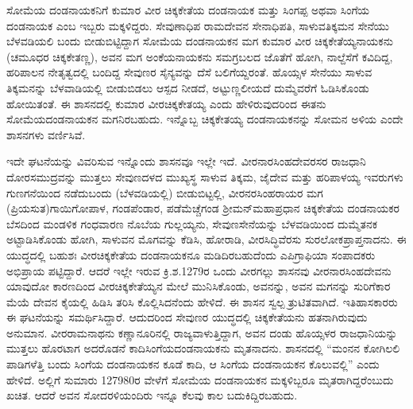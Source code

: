 \vskip 2pt

ಸೋಮೆಯ ದಂಡನಾಯಕನಿಗೆ ಕುಮಾರ ವೀರ ಚಿಕ್ಕಕೇತೆಯ ದಂಡನಾಯಕ ಮತ್ತು ಸಿಂಗಪ್ಪ ಅಥವಾ ಸಿಂಗೆಯ ದಂಡನಾಯಕ ಎಂಬ ಇಬ್ಬರು ಮಕ್ಕಳಿದ್ದರು. ಸೇವುಣಾಧಿಪ ರಾಮದೇವನ ಸೇನಾಧಿಪತಿ, ಸಾಳುವತಿಕ್ಕಮನ ಸೇನೆಯು ಬೆಳವಡಿಯಲಿ ಬಂದು ಬೀಡುಬಿಟ್ಟಿದ್ದಾಗ ಸೋಮೆಯ ದಂಡನಾಯಕನ ಮಗ ಕುಮಾರ ವೀರ ಚಿಕ್ಕಕೇತೆಯ್ಯನಾಯಕನು (ಚಮೂಧರ ಚಿಕ್ಕಕೇತಣ್ಣ), ಅವನ ಮಗ ಅಂಕೆಯನಾಯಕನು ಸಮಗ್ರಬಲದ ಜೊತೆಗೆ ಹೋಗಿ, ನಾಲ್ದೆಸೆಗೆ ಕವಿದಿದ್ದ, ಹರಿಪಾಲನ ನೇತೃತ್ವದಲ್ಲಿ ಬಂದಿದ್ದ ಸೇವುಣರ ಸೈನ್ಯವನ್ನು ದೆಸೆ ಬಲಿಗೆಯ್ದರಂತೆ. ಹೊಯ್ಸಳ ಸೇನೆಯು ಸಾಳುವ ತಿಕ್ಕಮನನ್ನು ಬೆಳವಾಡಿಯಲ್ಲಿ ಬೀಡುಬಿಡಲು ಆಸ್ಪದ ನೀಡದೆ, ಅಟ್ಟುಣ್ಣಲೀಯದೆ ದುಮ್ಮೆವರೆಗೆ ಓಡಿಸಿಕೊಂಡು ಹೋಯಿತಂತೆ. ಈ ಶಾಸನದಲ್ಲಿ ಕುಮಾರ ವೀರಚಿಕ್ಕಕೇತಯ್ಯ ಎಂದು ಹೇಳಿರುವುದರಿಂದ ಈತನು ಸೋಮೆಯದಂಡನಾಯಕನ ಮಗನಿರಬಹುದು. ಇನ್ನೊಬ್ಬ ಚಿಕ್ಕಕೇತಯ್ಯ ದಂಡನಾಯಕನನ್ನು ಸೋಮನ ಅಳಿಯ ಎಂದೇ ಶಾಸನಗಳು ವರ್ಣಿಸಿವೆ.

\vskip 2pt

ಇದೇ ಘಟನೆಯನ್ನು ವಿವರಿಸುವ ಇನ್ನೊಂದು ಶಾಸನವೂ ಇಲ್ಲೇ ಇದೆ. ವೀರನಾರಸಿಂಹದೇವರಸರ ರಾಜಧಾನಿ ದೋರಸಮುದ್ರವನ್ನು ಮುತ್ತಲು ಸೇವುಣದಳದ ಮುಖ್ಯಸ್ಥ ಸಾಳುವ ತಿಕ್ಕಮ, ಜೈದೇವ ಮತ್ತು ಹರಿಪಾಳಯ್ಯ ಇವರುಗಳು ಗುಣಗನೆಯಿಂದ ನಡೆದುಬಂದು (ಬೆಳವಡಿಯಲ್ಲಿ) ಬೀಡುಬಿಟ್ಟಲ್ಲಿ, ವೀರನರಸಿಂಹರಾಯರ ಮಗ (ಪ್ರಿಯಸುತ)\break ಗಾಯಿಗೋಪಾಳ, ಗಂಡಪೆಂಡಾರ, ಪಡೆಮೆಚ್ಚೆಗಂಡ ಶ‍್ರೀಮನ್​ಮಹಾಪ್ರಧಾನ ಚಿಕ್ಕಕೇತೆಯ ದಂಡನಾಯಕರ ಬೆಸದಿಂದ ಮಂಡಳಿಕ ಗಂಧವಾರಣ ನೊಬೆಯ ಗುಲ್ಲಯ್ಯನು, ಸೇವುಣಸೇನೆಯನ್ನು ಬೆಳವಡಿಯಿಂದ ದುಮ್ಮೆತನಕ ಅಟ್ಟಾಡಿಸಿಕೊಂಡು ಹೋಗಿ, ಸಾಳುವನ ಮೊಗವನ್ನು ಕೆಡಿಸಿ, ಹೋರಾಡಿ, ವೀರಸಿದ್ಧಿವೆರಸು ಸುರಲೋಕಪ್ರಾಪ್ತನಾದನು. ಈ ಯುದ್ಧದಲ್ಲಿ ಬಹುಶಃ ವೀರಚಿಕ್ಕಕೇತೆಯ ದಂಡನಾಯಕನೂ ಮಡಿದಿರಬಹುದೆಂದು ಎಪಿಗ್ರಾಫಿಯಾ ಸಂಪಾದಕರು ಅಭಿಪ್ರಾಯ ಪಟ್ಟಿದ್ದಾರೆ. ಆದರೆ ಇಲ್ಲೇ ಇರುವ ಕ್ರಿ.ಶ.1279ರ ಒಂದು ವೀರಗಲ್ಲು ಶಾಸನವು ವೀರನಾರಸಿಂಹದೇವನು ಯಾವುದೋ ಕಾರಣದಿಂದ ವೀರಚಿಕ್ಕಕೇತೆಯ್ಯನ ಮೇಲೆ ಮುನಿಸಿಕೊಂಡು, ಅವನನ್ನು, ಅವನ ಮಗನನ್ನು ಸುರಿಗೆಕಾರ ಮೆಯೆ ದೇವನ ಕೈಯಲ್ಲಿ ಹಿಡಿಸಿ ತರಿಸಿ ಕೊಲ್ಲಿಸಿದನೆಂದು ಹೇಳಿದೆ. ಈ ಶಾಸನ ಸ್ವಲ್ಪ ತ್ರುಟಿತವಾಗಿದೆ. ಇತಿಹಾಸಕಾರರು ಈ ಘಟನೆಯನ್ನು ಸಮರ್ಥಿಸಿದ್ದಾರೆ. ಆದುದರಿಂದ ಸೇವುಣರ ಯುದ್ಧದಲ್ಲಿ ಚಿಕ್ಕಕೇತೆಯನು ಹತನಾಗಿರುವುದು ಅನುಮಾನ. ವೀರರಾಮನಾಥನು ಕಣ್ಣಾನೂರಿನಲ್ಲಿ ರಾಜ್ಯವಾಳುತ್ತಿದ್ದಾಗ, ಅವನ ದಂಡು ಹೊಯ್ಸಳರ ರಾಜಧಾನಿಯನ್ನು ಮುತ್ತಲು ಹೊರಟಾಗ ಅದರೊಡನೆ ಕಾದಿ\break ಸಿಂಗೆಯದಂಡನಾಯಕನು ಮೃತನಾದನು. ಶಾಸನದಲ್ಲಿ “ಮಂನನ ಕೋಗಿಲಲಿ ಪಾಡಿಗಳೆತ್ತಿ ಬಂದು ಸಿಂಗೆಯ ದಂಡನಾಯಕನ ಕೂಡೆ ಕಾದಿ, ಆ ಸಿಂಗೆಯ ದಂಡನಾಯಕನ ಕೊಲುವಲ್ಲಿ” ಎಂದು ಹೇಳಿದೆ. ಅಲ್ಲಿಗೆ ಸುಮಾರು 1279\enginline{-}80ರ ವೇಳೆಗೆ ಸೋಮೆಯ ದಂಡನಾಯಕನ ಮಕ್ಕಳಿಬ್ಬರೂ ಮೃತರಾಗಿದ್ದರೆಂಬುದು ಖಚಿತ. ಆದರೆ ಅವನ ಸೋದರಳಿಯಂದಿರು ಇನ್ನೂ ಕೆಲವು ಕಾಲ ಬದುಕಿದ್ದಿರಬಹುದು.

\vskip 2pt

